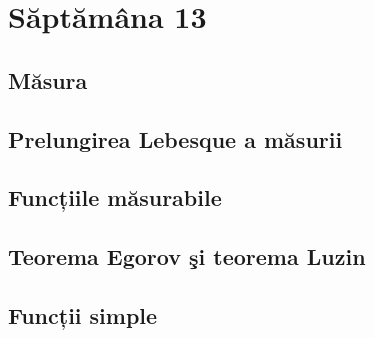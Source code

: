 \documentclass[a4paper,12pt]{article}
\theoremstyle{change}
\begin{document}
\section{Săptămâna 13}


\subsection{Măsura}

\subsection{Prelungirea Lebesque a măsurii}


\subsection{Funcțiile măsurabile}

\subsection{Teorema Egorov şi teorema Luzin}


\subsection{Funcții simple}
\end{document}
